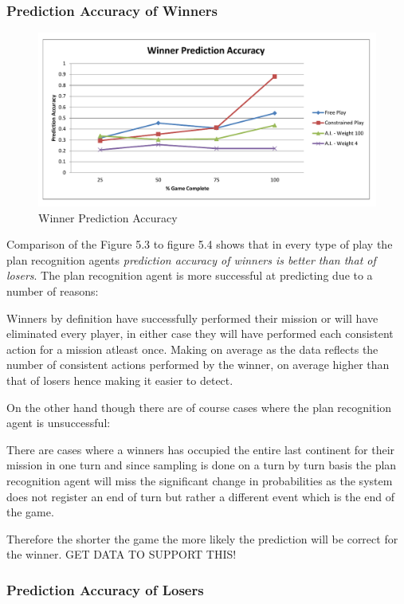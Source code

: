 \documentclass[parskip]{cs4rep}
\begin{document}
\subsubsection{Prediction Accuracy of Winners}

\begin{figure}[h]
\centerline{
\includegraphics[width=\textwidth]{images/winner-graph.pdf}
}
\caption{Winner Prediction Accuracy}
\label{fig:dom-debug-gui}
\end{figure} 

Comparison of the Figure 5.3 to figure 5.4 shows that in every type of play the plan recognition agents \textit{prediction accuracy of winners is better than that of losers}. The plan recognition agent is more successful at predicting due to a number of reasons:

Winners by definition have successfully performed their mission or will have eliminated every player, in either case they will have performed each consistent action for a mission atleast once. Making on average as the data reflects the number of consistent actions performed by the winner, on average higher than that of losers hence making it easier to detect.

On the other hand though there are of course cases where the plan recognition agent is unsuccessful: 

There are cases where a winners has occupied the entire last continent for their mission in one turn and since sampling is done on a turn by turn basis the plan recognition agent will miss the significant change in probabilities as the system does not register an end of turn but rather a different event which is the end of the game.

Therefore the shorter the game the more likely the prediction will be correct for the winner. GET DATA TO SUPPORT THIS! 

\subsubsection{Prediction Accuracy of Losers}
\end{document}
